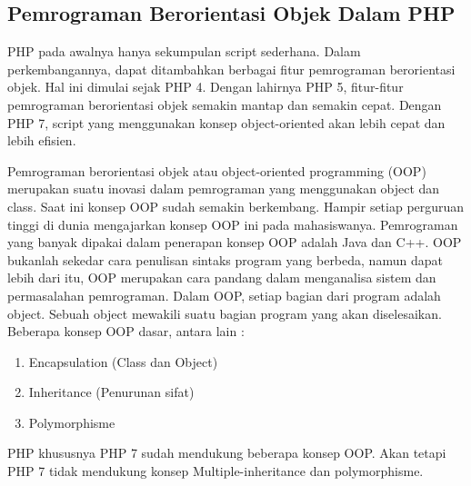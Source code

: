 \subsection{Pemrograman Berorientasi Objek Dalam PHP }
PHP pada awalnya hanya sekumpulan script sederhana. Dalam perkembangannya, dapat ditambahkan berbagai fitur pemrograman berorientasi objek. Hal ini dimulai sejak PHP 4. Dengan lahirnya PHP 5, fitur-fitur pemrograman berorientasi objek semakin mantap dan semakin cepat. Dengan PHP 7, script yang menggunakan konsep object-oriented akan lebih cepat dan lebih efisien.
\par
Pemrograman berorientasi objek atau object-oriented programming (OOP) merupakan suatu inovasi dalam pemrograman yang menggunakan object dan class. Saat ini konsep OOP sudah semakin berkembang. Hampir setiap perguruan tinggi di dunia mengajarkan konsep OOP ini pada mahasiswanya. Pemrograman yang banyak dipakai dalam penerapan konsep OOP adalah Java dan C++. OOP bukanlah sekedar cara penulisan sintaks program yang berbeda, namun dapat lebih dari itu, OOP merupakan cara pandang dalam menganalisa sistem dan permasalahan pemrograman. Dalam OOP, setiap bagian dari program adalah object. Sebuah object mewakili suatu bagian program yang akan diselesaikan. Beberapa konsep OOP dasar, antara lain :
\begin{enumerate}
\item Encapsulation (Class dan Object)
\item Inheritance (Penurunan sifat)
\item Polymorphisme
\end{enumerate}
\par
PHP khususnya PHP 7 sudah mendukung beberapa konsep OOP. Akan tetapi PHP 7 tidak mendukung konsep Multiple-inheritance dan polymorphisme.

